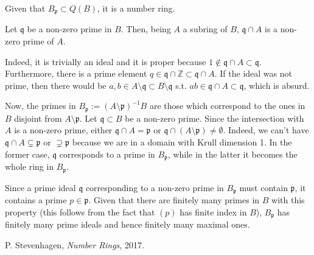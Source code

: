 \documentclass{article}
\newcommand{\numberset}{\mathbb}
\newcommand{\Z}{\numberset{Z}}
\newcommand{\pid}{\mathfrak{p}}
\newcommand{\qid}{\mathfrak{q}}
\begin{document}
Given that $B_{\pid}\subset Q(B)$, it is a number ring.

Let $\qid$ be a non-zero prime in $B$. Then, being $A$ a subring of $B$, $\qid\cap A$ is a non-zero prime of $A$.

Indeed, it is trivially an ideal and it is proper because $1\not\in\qid\cap A\subset\qid$. Furthermore, there is a prime element $q\in\qid\cap\Z\subset\qid\cap A$. If the ideal was not prime, then there would be $a,b\in A\setminus\qid\subset B\setminus\qid$ s.t. $ab\in\qid\cap A\subset\qid$, which is absurd.

Now, the primes in $B_{\pid}:=(A\setminus\pid)^{-1}B$ are those which correspond to the ones in $B$ disjoint from $A\setminus\pid$. Let $\qid\subset B$ be a non-zero prime. Since the intersection with $A$ is a non-zero prime, either $\qid\cap A=\pid$ or $\qid\cap(A\setminus\pid)\neq\emptyset$. Indeed, we can't have $\qid\cap A\subsetneq\pid$ or $\supsetneq\pid$ because we are in a domain with Krull dimension 1. In the former case, $\qid$ corresponds to a prime in $B_{\pid}$, while in the latter it becomes the whole ring in $B_{\pid}$.

Since a prime ideal $\qid$ corresponding to a non-zero prime in $B_{\pid}$ must contain $\pid$, it contains a prime $p\in\pid$. Given that there are finitely many primes in $B$ with this property (this follows from the fact that $(p)$ has finite index in $B$), $B_{\pid}$ has finitely many prime ideals and hence finitely many maximal ones.

\begin{thebibliography}{9}
				P. Stevenhagen,
				\textit{Number Rings},
				2017.
\end{thebibliography}
\end{document}

